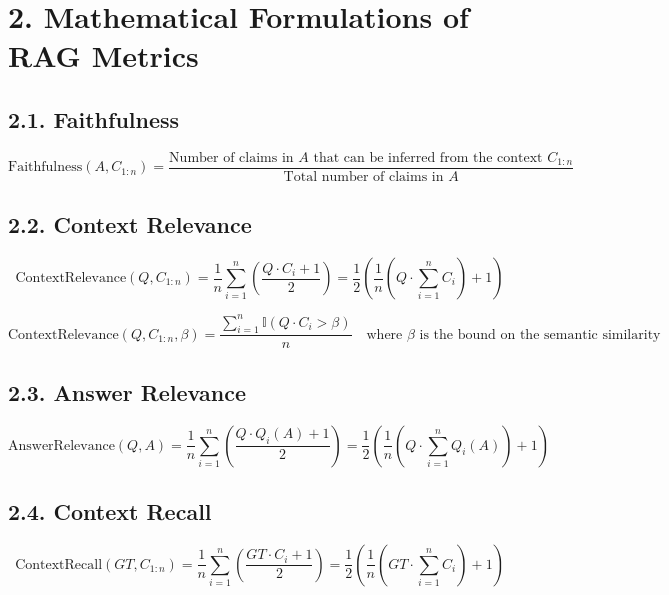 \documentclass[11pt,a4paper,fleqn]{article}
\begin{document}
\vspace{0.5cm}

\section*{2. Mathematical Formulations of RAG Metrics}

\subsection*{2.1. Faithfulness}
\hspace*{1em}%
\[
\text{Faithfulness}(A, C_{1:n}) = \frac{\text{Number of claims in } A \text{ that can be inferred from the context } C_{1:n}}{\text{Total number of claims in } A}
\]

\subsection*{2.2. Context Relevance}
\hspace*{1em}%
\[
\text{ContextRelevance}(Q, C_{1:n}) = \frac{1}{n} \sum_{i=1}^{n} \left( \frac{Q \cdot C_i + 1}{2} \right) = \frac{1}{2} \left(\frac{1}{n}\left(Q \cdot \sum_{i=1}^{n} C_i\right) + 1 \right)
\]

\[
\text{ContextRelevance}(Q, C_{1:n}, \beta) = \frac{\sum\limits_{i=1}^{n} \mathbb{I}(Q \cdot C_i > \beta)}{n} \quad \text{where } \beta \text{ is the bound on the semantic similarity}
\]

\subsection*{2.3. Answer Relevance}
\hspace*{1em}%
\[
\text{AnswerRelevance}(Q, A) = \frac{1}{n} \sum_{i=1}^{n} \left( \frac{Q \cdot Q_i(A) + 1}{2} \right) = \frac{1}{2} \left(\frac{1}{n}\left(Q \cdot \sum_{i=1}^{n} Q_i(A)\right) + 1 \right)
\]

\subsection*{2.4. Context Recall}
\hspace*{1em}%
\[
\text{ContextRecall}(GT, C_{1:n}) = \frac{1}{n} \sum_{i=1}^{n} \left( \frac{GT \cdot C_i + 1}{2} \right) = \frac{1}{2} \left(\frac{1}{n}\left(GT \cdot \sum_{i=1}^{n} C_i\right) + 1 \right)
\]
\end{document}
